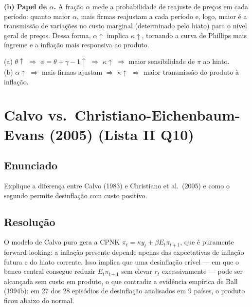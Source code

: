 \documentclass[12pt, a4paper]{article}
\begin{document}
\textbf{(b) Papel de $\alpha$.} A fração $\alpha$ mede a probabilidade de reajuste de preços em cada período: quanto maior $\alpha$, mais firmas reajustam a cada período e, logo, maior é a transmissão de variações no custo marginal (determinado pelo hiato) para o nível geral de preços. Dessa forma, $\alpha\uparrow$ implica $\kappa\uparrow$, tornando a curva de Phillips mais íngreme e a inflação mais responsiva ao produto.

\begin{resultbox}[title={Papel de $\theta$ e $\alpha$ na CPNK (Lista II Q9)}]
(a) $\theta\uparrow$ $\Rightarrow$ $\phi = \theta+\gamma-1\uparrow$ $\Rightarrow$ $\kappa\uparrow$ $\Rightarrow$ maior sensibilidade de $\pi$ ao hiato.\\
(b) $\alpha\uparrow$ $\Rightarrow$ mais firmas ajustam $\Rightarrow$ $\kappa\uparrow$ $\Rightarrow$ maior transmissão do produto à inflação.
\end{resultbox}

\section{Calvo vs.\ Christiano-Eichenbaum-Evans (2005) (Lista II Q10)}

\subsection*{Enunciado}
Explique a diferença entre Calvo (1983) e Christiano et al.\ (2005) e como o segundo permite desinflação com custo positivo.

\subsection*{Resolução}

O modelo de Calvo puro gera a CPNK $\pi_t = \kappa y_t + \beta E_t\pi_{t+1}$, que é puramente forward-looking: a inflação presente depende apenas das expectativas de inflação futura e do hiato corrente. Isso implica que uma desinflação crível --- em que o banco central consegue reduzir $E_t\pi_{t+1}$ sem elevar $r_t$ excessivamente --- pode ser alcançada sem custo em produto, o que contradiz a evidência empírica de Ball (1994b): em 27 dos 28 episódios de desinflação analisados em 9 países, o produto ficou abaixo do normal.
\end{document}

